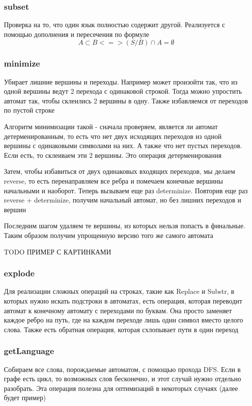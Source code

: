\subsubsection*{subset}
Проверка на то, что один язык полностью содержит другой. Реализуется с помощью дополнения и пересечения по формуле
\[A \subset B <=> (S / B) \cap A = \emptyset\]

\subsubsection*{minimize}
Убирает лишние вершины и переходы. Например может произойти так, что из одной вершины ведут 2 перехода с одинаковой строкой. Тогда можно упростить автомат так, чтобы склеились 2 вершины в одну. Также избавляемся от переходов по пустой строке

Алгоритм минимизации такой - сначала проверяем, является ли автомат детерменированным, то есть что нет двух исходящих переходов из одной вершины с одинаковыми символами на них. А также что нет пустых переходов. Если есть, то склеиваем эти 2 вершины. Это операция детерменирования

Затем, чтобы избавиться от двух одинаковых входящих переходов, мы делаем reverse, то есть перенаправляем все ребра и помечаем конечные вершины начальными и наоборот. Теперь вызываем еще раз determinize. Повторив еще раз reverse + determinize, получим начальный автомат, но без лишних переходов и вершин

Последним шагом удаляем те вершины, из которых нельзя попасть в финальные. Таким образом получим упрощенную версию того же самого автомата

TODO ПРИМЕР С КАРТИНКАМИ

\subsubsection*{explode}
Для реализации сложных операций на строках, такие как Replace и Substr, в которых нужно искать подстроки в автоматах, есть операция, которая переводит автомат к конечному автомату с переходами по буквам. Она просто заменяет каждое ребро на путь, где на каждом переходе лишь один символ вместо целого слова. Также есть обратная операция, которая схлопывает пути в один переход

\subsubsection*{getLanguage}
Собираем все слова, порождаемые автоматом, с помощью прохода DFS. Если в графе есть цикл, то возможных слов бесконечно, и этот случай нужно отдельно разобрать. Эта операция полезна для оптимизаций в некоторых случаях (далее будет пример)

